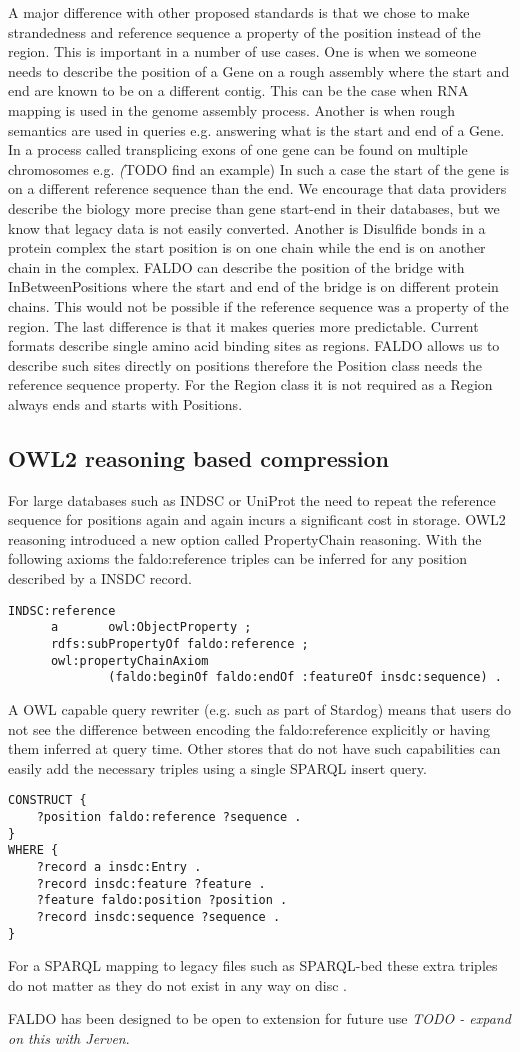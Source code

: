 A major difference with other proposed standards is that we chose to make strandedness and reference sequence a property of the position instead of the region.
This is important in a number of use cases.
One is when we someone needs to describe the position of a Gene on a rough assembly where the start and end are known to be on a different contig. 
This can be the case when RNA mapping is used in the genome assembly process.
Another is when rough semantics are used in queries e.g. answering what is the start and end of a Gene. 
In a process called transplicing exons of one gene can be found on multiple chromosomes e.g. \textit(TODO find an example)
In such a case the start of the gene is on a different reference sequence than the end.
We encourage that data providers describe the biology more precise than gene start-end in their databases, but we know that legacy data is not easily converted.
Another is Disulfide bonds in a protein complex the start position is on one chain while the end is on another chain in the complex.
FALDO can describe the position of the bridge with InBetweenPositions where the start and end of the bridge is on different protein chains.
This would not be possible if the reference sequence was a property of the region. 
The last difference is that it makes queries more predictable. 
Current formats describe single amino acid binding sites as regions.
FALDO allows us to describe such sites directly on positions therefore the Position class needs the reference sequence property.
For the Region class it is not required as a Region always ends and starts with Positions.

\subsection*{OWL2 reasoning based compression}
For large databases such as INDSC or UniProt the need to repeat the reference sequence for positions again and again incurs a significant cost in storage.
OWL2 reasoning introduced a new option called PropertyChain reasoning. 
With the following axioms the faldo:reference triples can be inferred for any position described by a INSDC record.
\begin{verbatim}
INDSC:reference
      a       owl:ObjectProperty ;
      rdfs:subPropertyOf faldo:reference ;
      owl:propertyChainAxiom
              (faldo:beginOf faldo:endOf :featureOf insdc:sequence) .
\end{verbatim}
A OWL capable query rewriter (e.g. such as part of Stardog) means that users do not see the difference between encoding the faldo:reference explicitly or having them inferred at query time.
Other stores that do not have such capabilities can easily add the necessary triples using a single SPARQL insert query.
\begin{verbatim}
CONSTRUCT {
    ?position faldo:reference ?sequence .
}
WHERE {
    ?record a insdc:Entry .
    ?record insdc:feature ?feature .
    ?feature faldo:position ?position .
    ?record insdc:sequence ?sequence .
}
\end{verbatim} 
For a SPARQL mapping to legacy files such as SPARQL-bed these extra triples do not matter as they do not exist in any way on disc .


FALDO has been designed to be open to extension for future
use \textit{TODO - expand on this with Jerven}.
